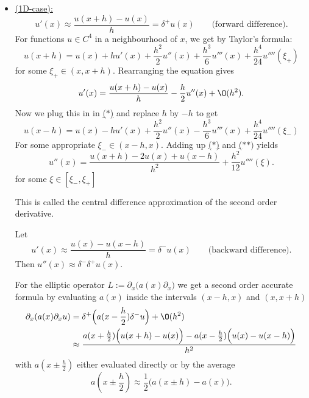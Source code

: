 \begin{itemize}
	\item \underline{(1D-case):} 
		\[
			u'(x) \approx \frac{u(x+h)-u(x)}{h} = \delta^{+}u(x) \qquad \text{(forward difference)}
		.\] 
		For functions $u \in C^{4}$ in a neighbourhood of $x$, we get by Taylor's formula:
		\begin{equation} \label{eq:eq_3} \tag{$\ast$}
			u(x+h) = u(x) + h u'(x) + \frac{h^{2}}{2} u''(x) + \frac{h^{3}}{6}u'''(x) + \frac{h^{4}}{24}u''''(\xi_{+})	
		\end{equation}
		for some $\xi_{+} \in (x, x+h)$. Rearranging the equation gives
		\[
			u'(x) = \frac{u(x+h)-u(x)}{h}-\frac{h}{2}u''(x) + \O(h^{2})
		.\] 
		Now we plug this in in \href{eq:eq_4}{($\ast$)} and replace $h$ by $-h$ to get
		\begin{equation} \label{eq:eq_4} \tag{$\ast \ast$}
			u(x-h) = u(x) - hu'(x) + \frac{h^{2}}{2}u''(x)- \frac{h^{3}}{6} u'''(x) + \frac{h^{4}}{24}u''''(\xi _{-})
		\end{equation}
		For some appropriate $\xi _{-} \in (x-h, x)$.
		Adding up \href{eq:eq_3}{($\ast$)} and \href{eq:eq_4}{($\ast \ast)$} yields
		\[
			u''(x)= \frac{u(x+h) - 2u(x) + u(x-h)}{h^{2}} + \frac{h^{2}}{12}u''''(\xi )
		.\] for some $\xi  \in [\xi _{-}, \xi _{+}]$

		This is called the central difference approximation of the second order derivative.
		
		Let
		\[
			u'(x) \approx \frac{u(x)-u(x-h)}{h} = \delta^{-}u(x) \qquad \text{(backward difference)}
		.\] Then $u''(x) \approx \delta^{-}\delta^{+}u(x)$.

		For the elliptic operator $L:=\partial_{x} \Big(a(x)\partial_{x}\Big)$ we get a second order accurate formula by evaluating $a(x)$ inside the intervals $(x-h, x)$ and $(x, x+h)$
		\begin{align*}
			\partial_{x}(a(x) \partial_{x}u) &=
			\delta^{+}\Big(a(x- \frac{h}{2}) \delta^{-} u\Big) + \O(h^{2}) \\
											 &\approx \frac{a(x+\frac{h}{2})\Big(u(x+h)-u(x)\Big)-a(x-\frac{h}{2})\Big(u(x)-u(x-h)\Big)}{h^{2}}
		\end{align*}
		with $a(x \pm \frac{h}{2})$ either evaluated directly or by the average
		\[
			a(x \pm \frac{h}{2}) \approx \frac{1}{2}\Big(a(x \pm h) - a(x)\Big)
		.\] 
		

\end{itemize}
